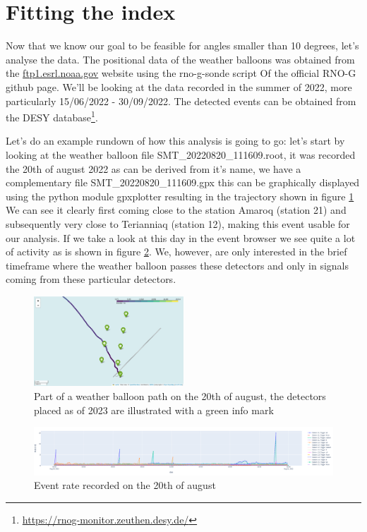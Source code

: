 \documentclass[11pt,a4paper,faculty=we,language=en,doctype=report]{cls/ugent-doc}
\begin{document}
\section{Fitting the index}
Now that we know our goal to be feasible for angles smaller than 10 degrees, let's
analyse the data. The positional data of the weather balloons was obtained from the \url{ftp1.esrl.noaa.gov} website using
the rno-g-sonde script Of the official RNO-G github page. We'll be looking at the data recorded in the summer of 2022, more
particularly 15/06/2022 - 30/09/2022. The detected events can be obtained from the DESY database\footnote{\url{https://rnog-monitor.zeuthen.desy.de/}}.

Let's do an example rundown of how this analysis is going to go: let's start by
looking at the weather balloon file SMT\_20220820\_111609.root, it was recorded
the 20th of august 2022 as can be derived from it's name, we have a
complementary file SMT\_20220820\_111609.gpx this can be graphically displayed
using the python module gpxplotter resulting in the trajectory shown in figure
\ref{fig:IntWB} We can see it clearly first coming close to the station Amaroq (station 21) and subsequently very close to 
Terianniaq (station 12), making this event usable for our analysis.
If we take a look at this day in the event browser we see quite a lot of activity
as is shown in figure \ref{fig:20thEvents}. We, however, are only interested in the brief timeframe where the weather balloon
passes these detectors and only in signals coming from these particular detectors.
\begin{figure}
  \centering
  \includegraphics[width=0.5\textwidth]{InteractingWeatherBalloonPath.png}
  \caption{Part of a weather balloon path on the 20th of august, the detectors placed as of 2023 are illustrated with
  a green info mark}
  \label{fig:IntWB}
\end{figure}

\begin{figure}[h!]
  \centering
  \includegraphics[width=\textwidth]{Events20Aug.png}
  \caption{Event rate recorded on the 20th of august}
  \label{fig:20thEvents}
\end{figure}
\end{document}
